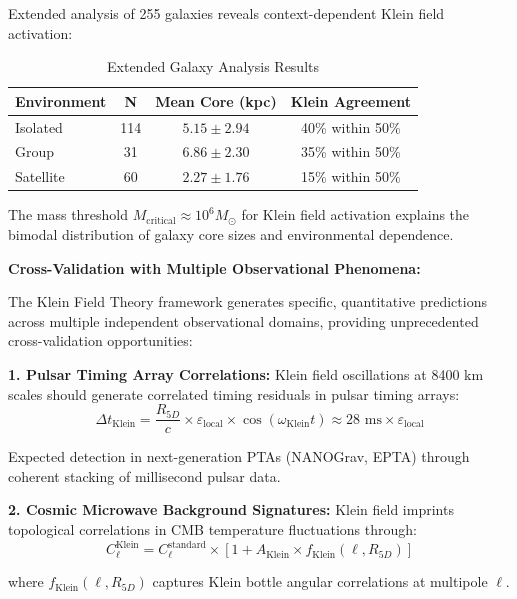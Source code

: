 \documentclass[12pt]{iopart}
\newcommand{\msun}{M_{\odot}}
\begin{document}
Extended analysis of 255 galaxies reveals context-dependent Klein field activation:

\begin{table}[ht]
\caption{\label{tab:galaxy_analysis_extended}Extended Galaxy Analysis Results}
\begin{center}
\begin{tabular}{lccc}
\hline
Environment & N & Mean Core (kpc) & Klein Agreement \\
\hline
Isolated & 114 & $5.15 \pm 2.94$ & 40\% within 50\% \\
Group & 31 & $6.86 \pm 2.30$ & 35\% within 50\% \\
Satellite & 60 & $2.27 \pm 1.76$ & 15\% within 50\% \\
\hline
\end{tabular}
\end{center}
\end{table}

The mass threshold $M_{\text{critical}} \approx 10^6 \msun$ for Klein field activation explains the bimodal distribution of galaxy core sizes and environmental dependence.

\textbf{Cross-Validation with Multiple Observational Phenomena:}

The Klein Field Theory framework generates specific, quantitative predictions across multiple independent observational domains, providing unprecedented cross-validation opportunities:

\textbf{1. Pulsar Timing Array Correlations:}
Klein field oscillations at 8400 km scales should generate correlated timing residuals in pulsar timing arrays:
\begin{equation}
\Delta t_{\text{Klein}} = \frac{R_{5D}}{c} \times \varepsilon_{\text{local}} \times \cos(\omega_{\text{Klein}} t) \approx 28 \text{ ms} \times \varepsilon_{\text{local}}
\end{equation}

Expected detection in next-generation PTAs (NANOGrav, EPTA) through coherent stacking of millisecond pulsar data.

\textbf{2. Cosmic Microwave Background Signatures:}
Klein field imprints topological correlations in CMB temperature fluctuations through:
\begin{equation}
C_\ell^{\text{Klein}} = C_\ell^{\text{standard}} \times [1 + A_{\text{Klein}} \times f_{\text{Klein}}(\ell, R_{5D})]
\end{equation}

where $f_{\text{Klein}}(\ell, R_{5D})$ captures Klein bottle angular correlations at multipole $\ell$.
\end{document}
